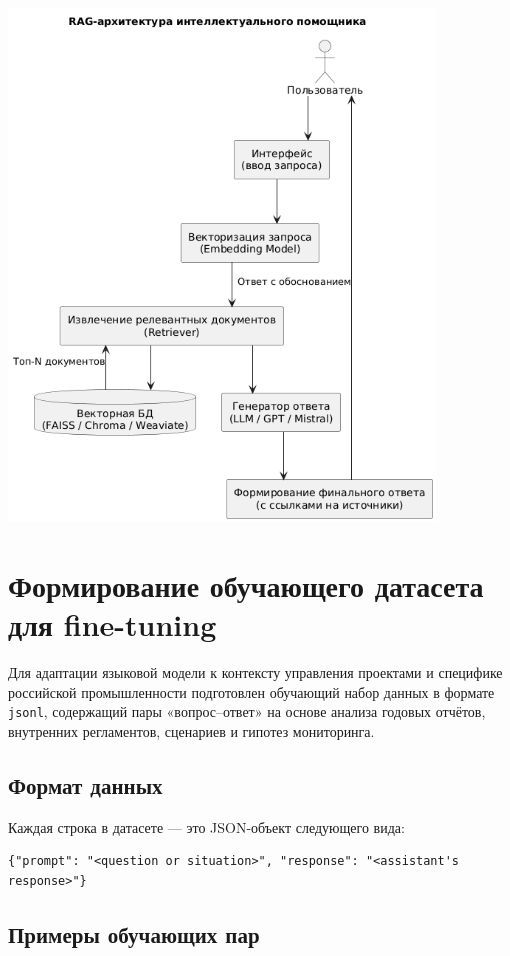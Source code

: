 \documentclass[12pt]{article}
\begin{document}
\begin{center}
\includegraphics[width=0.85\textwidth]{2.png}
\end{center}


\section{Формирование обучающего датасета для fine-tuning}

Для адаптации языковой модели к контексту управления проектами и специфике российской промышленности подготовлен обучающий набор данных в формате \texttt{jsonl}, содержащий пары «вопрос–ответ» на основе анализа годовых отчётов, внутренних регламентов, сценариев и гипотез мониторинга.

\subsection{Формат данных}

Каждая строка в датасете — это JSON-объект следующего вида:

\begin{lstlisting}
{"prompt": "<question or situation>", "response": "<assistant's response>"}
\end{lstlisting}

\subsection{Примеры обучающих пар}
\end{document}
